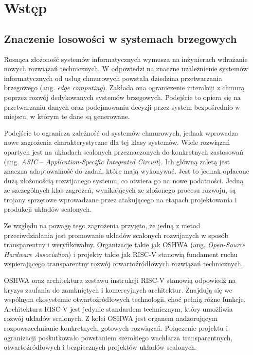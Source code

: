\chapter{Wstęp}

\section{Znaczenie losowości w systemach brzegowych}

\noindent Rosnąca złożoność systemów informatycznych wymusza na inżynierach 
wdrażanie nowych rozwiązań technicznych. W odpowiedzi na znaczne 
uzależnienie systemów informatycznych od usług chmurowych powstała dziedzina 
przetwarzania brzegowego (ang. \textit{edge computing}). Zakłada ona ograniczenie 
interakcji z chmurą poprzez rozwój dedykowanych systemów brzegowych. Podejście 
to opiera się na przetwarzaniu danych oraz podejmowaniu decyzji przez system 
bezpośrednio w miejscu, w którym te dane są generowane.

Podejście to ogranicza zależność od systemów chmurowych, jednak wprowadza nowe 
zagrożenia charakterystyczne dla tej klasy systemów. Wiele rozwiązań opartych 
jest na układach scalonych przeznaczonych do konkretnych zastosowań (ang. \textit{ASIC} --
 \textit{Application-Specific Integrated Circuit}). Ich główną zaletą jest 
 znaczna adaptowalność do zadań, które mają wykonywać. Jest to jednak 
 opłacone dużą złożonością rozwijanego systemu, co otwiera go na nowe podatności. 
 Jedną ze szczególnych klas zagrożeń, wynikających ze złożonego procesu rozwoju, są trojany 
 sprzętowe wprowadzane przez atakującego na etapach projektowania i produkcji 
 układów scalonych.

Ze względu na powagę tego zagrożenia przyjęto, że jedną z metod przeciwdziałania 
jest promowanie układów scalonych rozwijanych w sposób transparentny i 
weryfikowalny. Organizacje takie jak OSHWA (ang. \textit{Open-Source Hardware Association}) 
i projekty takie jak RISC-V stanowią fundament ruchu wspierającego transparentny 
rozwój otwartoźródłowych rozwiązań technicznych.

OSHWA oraz architektura zestawu instrukcji RISC-V stanowią odpowiedź na kryzys 
zaufania do zamkniętych i komercyjnych architektur. Znajdują się 
we wspólnym ekosystemie otwartoźródłowych technologii, choć pełnią różne 
funkcje. Architektura RISC-V jest jedynie standardem technicznym, który 
umożliwia rozwój układów scalonych. Z kolei OSHWA jest organem nadzorującym 
rozpowszechnianie konkretnych, gotowych rozwiązań. Połączenie projektu i ogranizacji 
poskutkowało powstaniem szerokiego wachlarza transparentnych, otwartoźródłowych 
i bezpiecznych projektów układów scalonych.

